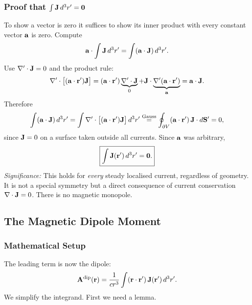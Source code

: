 \subsubsection*{Proof that $\int\mathbf{J}\,d^3r' = \mathbf{0}$}

To show a vector is zero it suffices to show its inner product with every constant
vector $\mathbf{a}$ is zero.  Compute
\begin{equation}\label{eq:lec15-mono-start}
  \mathbf{a}\cdot\int\mathbf{J}\,d^3r' = \int(\mathbf{a}\cdot\mathbf{J})\,d^3r'.
\end{equation}
Use $\nabla'\cdot\mathbf{J} = 0$ and the product rule:
\begin{equation}\label{eq:lec15-div-id}
  \nabla'\cdot\bigl[(\mathbf{a}\cdot\mathbf{r}')\mathbf{J}\bigr]
  = (\mathbf{a}\cdot\mathbf{r}')\underbrace{\nabla'\cdot\mathbf{J}}_{0}
    + \mathbf{J}\cdot\underbrace{\nabla'(\mathbf{a}\cdot\mathbf{r}')}_{\mathbf{a}}
  = \mathbf{a}\cdot\mathbf{J}.
\end{equation}
Therefore
\begin{equation}\label{eq:lec15-gauss-monopole}
  \int(\mathbf{a}\cdot\mathbf{J})\,d^3r'
  = \int\nabla'\cdot\bigl[(\mathbf{a}\cdot\mathbf{r}')\mathbf{J}\bigr]\,d^3r'
  \overset{\text{Gauss}}{=}
  \oint_{\partial V}(\mathbf{a}\cdot\mathbf{r}')\,\mathbf{J}\cdot d\mathbf{S}' = 0,
\end{equation}
since $\mathbf{J} = 0$ on a surface taken outside all currents.  Since $\mathbf{a}$ was
arbitrary,
\begin{equation}\label{eq:lec15-no-monopole}
  \boxed{\int\mathbf{J}(\mathbf{r}')\,d^3r' = \mathbf{0}.}
\end{equation}
\textit{Significance:} This holds for \emph{every} steady localised current, regardless
of geometry.  It is not a special symmetry but a direct consequence of current
conservation $\nabla\cdot\mathbf{J} = 0$.  There is no magnetic monopole.

\subsection{The Magnetic Dipole Moment}\label{subsec:lec15-dipole}

\subsubsection*{Mathematical Setup}

The leading term is now the dipole:
\begin{equation}\label{eq:lec15-dipole-raw}
  \mathbf{A}^{\rm dip}(\mathbf{r}) = \frac{1}{cr^3}\int(\mathbf{r}\cdot\mathbf{r}')\,\mathbf{J}(\mathbf{r}')\,d^3r'.
\end{equation}
We simplify the integrand.  First we need a lemma.

